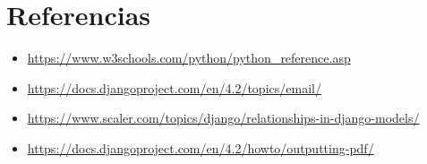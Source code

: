 \documentclass{article}
\begin{document}
\section{Referencias}
\begin{itemize}	
    \item \url{https://www.w3schools.com/python/python_reference.asp}
    \item \url{https://docs.djangoproject.com/en/4.2/topics/email/}
    \item \url{https://www.scaler.com/topics/django/relationships-in-django-models/}
    \item \url{https://docs.djangoproject.com/en/4.2/howto/outputting-pdf/}
\end{itemize}	
	
%
%
%
			
\end{document}
